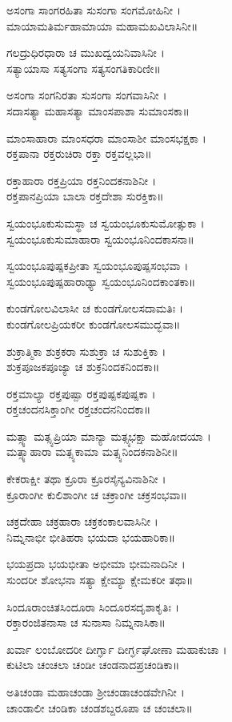 ಅಸಂಗಾ ಸಾಂಗರಹಿತಾ ಸುಸಂಗಾ ಸಂಗಮೋಹಿನೀ ।\\
ಮಾಯಾಮತಿರ್ಮಹಾಮಾಯಾ ಮಹಾಮಖವಿಲಾಸಿನೀ॥

ಗಲದ್ರುಧಿರಧಾರಾ ಚ ಮುಖದ್ವಯನಿವಾಸಿನೀ ।\\
ಸತ್ಯಾಯಾಸಾ ಸತ್ಯಸಂಗಾ ಸತ್ಯಸಂಗತಿಕಾರಿಣೀ॥

ಅಸಂಗಾ ಸಂಗನಿರತಾ ಸುಸಂಗಾ ಸಂಗವಾಸಿನೀ ।\\
ಸದಾಸತ್ಯಾ ಮಹಾಸತ್ಯಾ ಮಾಂಸಪಾಶಾ ಸುಮಾಂಸಕಾ॥

ಮಾಂಸಾಹಾರಾ ಮಾಂಸಧರಾ ಮಾಂಸಾಶೀ ಮಾಂಸಭಕ್ಷಕಾ ।\\
ರಕ್ತಪಾನಾ ರಕ್ತರುಚಿರಾ ರಕ್ತಾ ರಕ್ತವಲ್ಲಭಾ॥

ರಕ್ತಾಹಾರಾ ರಕ್ತಪ್ರಿಯಾ ರಕ್ತನಿಂದಕನಾಶಿನೀ ।\\
ರಕ್ತಪಾನಪ್ರಿಯಾ ಬಾಲಾ ರಕ್ತದೇಶಾ ಸುರಕ್ತಿಕಾ॥

ಸ್ವಯಂಭೂಕುಸುಮಸ್ಥಾ ಚ ಸ್ವಯಂಭೂಕುಸುಮೋತ್ಸುಕಾ ।\\
ಸ್ವಯಂಭೂಕುಸುಮಾಹಾರಾ ಸ್ವಯಂಭೂನಿಂದಕಾಸನಾ॥

ಸ್ವಯಂಭೂಪುಷ್ಪಕಪ್ರೀತಾ ಸ್ವಯಂಭೂಪುಷ್ಪಸಂಭವಾ ।\\
ಸ್ವಯಂಭೂಪುಷ್ಪಹಾರಾಢ್ಯಾ ಸ್ವಯಂಭೂನಿಂದಕಾಂತಕಾ॥

ಕುಂಡಗೋಲವಿಲಾಸೀ ಚ ಕುಂಡಗೋಲಸದಾಮತಿಃ ।\\
ಕುಂಡಗೋಲಪ್ರಿಯಕರೀ ಕುಂಡಗೋಲಸಮುದ್ಭವಾ॥

ಶುಕ್ರಾತ್ಮಿಕಾ ಶುಕ್ರಕರಾ ಸುಶುಕ್ರಾ ಚ ಸುಶುಕ್ತಿಕಾ ।\\
ಶುಕ್ರಪೂಜಕಪೂಜ್ಯಾ ಚ ಶುಕ್ರನಿಂದಕನಿಂದಕಾ॥

ರಕ್ತಮಾಲ್ಯಾ ರಕ್ತಪುಷ್ಪಾ ರಕ್ತಪುಷ್ಪಕಪುಷ್ಪಕಾ ।\\
ರಕ್ತಚಂದನಸಿಕ್ತಾಂಗೀ ರಕ್ತಚಂದನನಿಂದಕಾ॥

ಮತ್ಸ್ಯಾ ಮತ್ಸ್ಯಪ್ರಿಯಾ ಮಾನ್ಯಾ ಮತ್ಸ್ಯಭಕ್ಷಾ ಮಹೋದಯಾ ।\\
ಮತ್ಸ್ಯಾಹಾರಾ ಮತ್ಸ್ಯಕಾಮಾ ಮತ್ಸ್ಯನಿಂದಕನಾಶಿನೀ॥

ಕೇಕರಾಕ್ಷೀ ತಥಾ ಕ್ರೂರಾ ಕ್ರೂರಸೈನ್ಯವಿನಾಶಿನೀ ।\\
ಕ್ರೂರಾಂಗೀ ಕುಲಿಶಾಂಗೀ ಚ ಚಕ್ರಾಂಗೀ ಚಕ್ರಸಂಭವಾ॥

ಚಕ್ರದೇಹಾ ಚಕ್ರಹಾರಾ ಚಕ್ರಕಂಕಾಲವಾಸಿನೀ ।\\
ನಿಮ್ನನಾಭೀ ಭೀತಿಹರಾ ಭಯದಾ ಭಯಹಾರಿಕಾ॥

ಭಯಪ್ರದಾ ಭಯಭೀತಾ ಅಭೀಮಾ ಭೀಮನಾದಿನೀ ।\\
ಸುಂದರೀ ಶೋಭನಾ ಸತ್ಯಾ ಕ್ಷೇಮ್ಯಾ ಕ್ಷೇಮಕರೀ ತಥಾ॥

ಸಿಂದೂರಾಂಚಿತಸಿಂದೂರಾ ಸಿಂದೂರಸದೃಶಾಕೃತಿಃ ।\\
ರಕ್ತಾರಂಜಿತನಾಸಾ ಚ ಸುನಾಸಾ ನಿಮ್ನನಾಸಿಕಾ॥

ಖರ್ವಾ ಲಂಬೋದರೀ ದೀರ್ಗ್ಘಾ ದೀರ್ಗ್ಘಘೋಣಾ ಮಹಾಕುಚಾ ।\\
ಕುಟಿಲಾ ಚಂಚಲಾ ಚಂಡೀ ಚಂಡನಾದಪ್ರಚಂಡಿಕಾ॥

ಅತಿಚಂಡಾ ಮಹಾಚಂಡಾ ಶ್ರೀಚಂಡಾಚಂಡವೇಗಿನೀ ।\\
ಚಾಂಡಾಲೀ ಚಂಡಿಕಾ ಚಂಡಶಬ್ದರೂಪಾ ಚ ಚಂಚಲಾ॥

